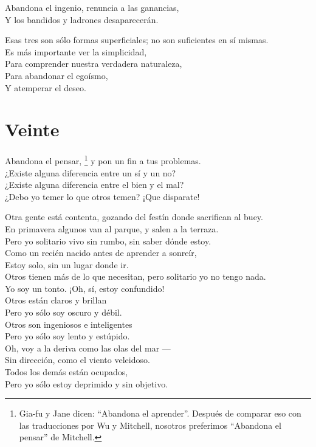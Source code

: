 \documentclass[hidelinks]{memoir}
\begin{document}
	Abandona el ingenio, renuncia a las ganancias,\\
	Y los bandidos y ladrones desaparecerán.
	
	Esas tres son sólo formas superficiales; no son suficientes en sí
	mismas.\\
	Es más importante ver la simplicidad,\\
	Para comprender nuestra verdadera naturaleza,\\
	Para abandonar el egoísmo,\\
	Y atemperar el deseo.
	
	\chapter*{Veinte}
	
	Abandona el pensar, \footnote{Gia-fu y Jane dicen: ``Abandona el aprender''. Después de comparar eso
		con las traducciones por Wu y Mitchell, nosotros preferimos ``Abandona
		el pensar'' de Mitchell.} y pon un fin a tus problemas.\\
	¿Existe alguna diferencia entre un sí y un no?\\
	¿Existe alguna diferencia entre el bien y el mal?\\
	¿Debo yo temer lo que otros temen? ¡Que disparate!
	
	Otra gente está contenta, gozando del festín donde sacrifican al buey.\\
	En primavera algunos van al parque, y salen a la terraza.\\
	Pero yo solitario vivo sin rumbo, sin saber dónde estoy.\\
	Como un recién nacido antes de aprender a sonreír,\\
	Estoy solo, sin un lugar donde ir.\\
	Otros tienen más de lo que necesitan, pero solitario yo no tengo nada.\\
	Yo soy un tonto. ¡Oh, sí, estoy confundido!\\
	Otros están claros y brillan\\
	Pero yo sólo soy oscuro y débil.\\
	Otros son ingeniosos e inteligentes\\
	Pero yo sólo soy lento y estúpido.\\
	Oh, voy a la deriva como las olas del mar ---\\
	Sin dirección, como el viento veleidoso.\\
	Todos los demás están ocupados,\\
	Pero yo sólo estoy deprimido y sin objetivo.
	
\end{document}
